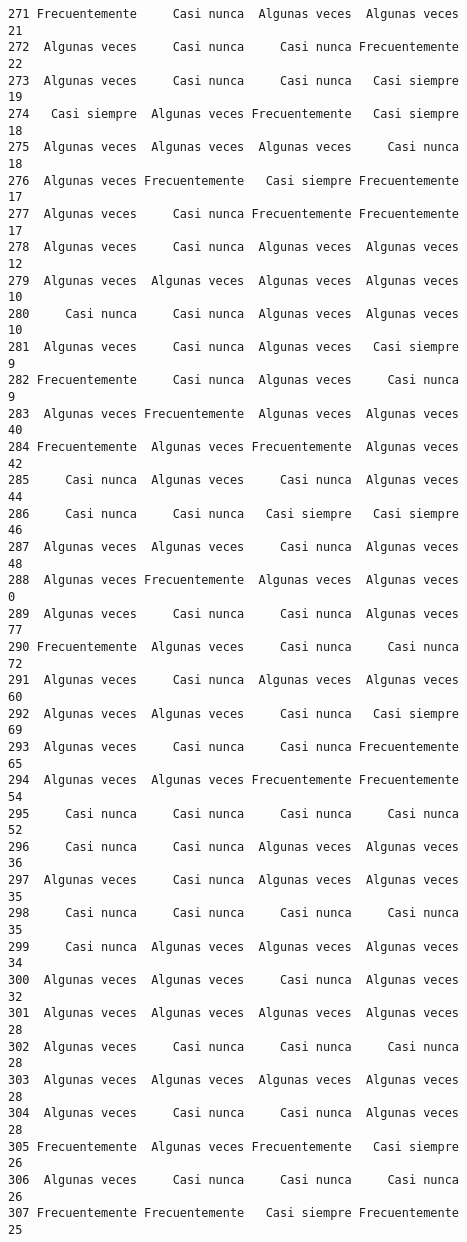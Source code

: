 \documentclass[
  letterpaper,
  DIV=11,
  numbers=noendperiod]{scrartcl}
\begin{document}
\begin{verbatim}
271 Frecuentemente     Casi nunca  Algunas veces  Algunas veces      21
272  Algunas veces     Casi nunca     Casi nunca Frecuentemente      22
273  Algunas veces     Casi nunca     Casi nunca   Casi siempre      19
274   Casi siempre  Algunas veces Frecuentemente   Casi siempre      18
275  Algunas veces  Algunas veces  Algunas veces     Casi nunca      18
276  Algunas veces Frecuentemente   Casi siempre Frecuentemente      17
277  Algunas veces     Casi nunca Frecuentemente Frecuentemente      17
278  Algunas veces     Casi nunca  Algunas veces  Algunas veces      12
279  Algunas veces  Algunas veces  Algunas veces  Algunas veces      10
280     Casi nunca     Casi nunca  Algunas veces  Algunas veces      10
281  Algunas veces     Casi nunca  Algunas veces   Casi siempre       9
282 Frecuentemente     Casi nunca  Algunas veces     Casi nunca       9
283  Algunas veces Frecuentemente  Algunas veces  Algunas veces      40
284 Frecuentemente  Algunas veces Frecuentemente  Algunas veces      42
285     Casi nunca  Algunas veces     Casi nunca  Algunas veces      44
286     Casi nunca     Casi nunca   Casi siempre   Casi siempre      46
287  Algunas veces  Algunas veces     Casi nunca  Algunas veces      48
288  Algunas veces Frecuentemente  Algunas veces  Algunas veces       0
289  Algunas veces     Casi nunca     Casi nunca  Algunas veces      77
290 Frecuentemente  Algunas veces     Casi nunca     Casi nunca      72
291  Algunas veces     Casi nunca  Algunas veces  Algunas veces      60
292  Algunas veces  Algunas veces     Casi nunca   Casi siempre      69
293  Algunas veces     Casi nunca     Casi nunca Frecuentemente      65
294  Algunas veces  Algunas veces Frecuentemente Frecuentemente      54
295     Casi nunca     Casi nunca     Casi nunca     Casi nunca      52
296     Casi nunca     Casi nunca  Algunas veces  Algunas veces      36
297  Algunas veces     Casi nunca  Algunas veces  Algunas veces      35
298     Casi nunca     Casi nunca     Casi nunca     Casi nunca      35
299     Casi nunca  Algunas veces  Algunas veces  Algunas veces      34
300  Algunas veces  Algunas veces     Casi nunca  Algunas veces      32
301  Algunas veces  Algunas veces  Algunas veces  Algunas veces      28
302  Algunas veces     Casi nunca     Casi nunca     Casi nunca      28
303  Algunas veces  Algunas veces  Algunas veces  Algunas veces      28
304  Algunas veces     Casi nunca     Casi nunca  Algunas veces      28
305 Frecuentemente  Algunas veces Frecuentemente   Casi siempre      26
306  Algunas veces     Casi nunca     Casi nunca     Casi nunca      26
307 Frecuentemente Frecuentemente   Casi siempre Frecuentemente      25

\end{verbatim}
\end{document}
